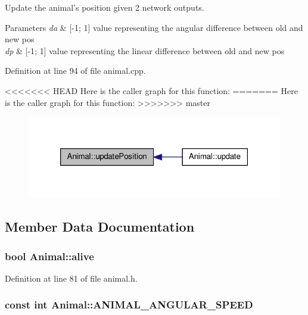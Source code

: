 Update the animal's position given 2 network outputs. 


\begin{DoxyParams}{Parameters}
{\em da} & \mbox{[}-\/1; 1\mbox{]} value representing the angular difference between old and new pos \\
\hline
{\em dp} & \mbox{[}-\/1; 1\mbox{]} value representing the linear difference between old and new pos \\
\hline
\end{DoxyParams}


Definition at line 94 of file animal.\-cpp.



<<<<<<< HEAD
Here is the caller graph for this function\-:
\nopagebreak
=======
Here is the caller graph for this function\-:\nopagebreak
>>>>>>> master
\begin{figure}[H]
\begin{center}
\leavevmode
\includegraphics[width=316pt]{class_animal_a0b6103b76a223ce2eaad73877ff85c73_icgraph}
\end{center}
\end{figure}




\subsection{Member Data Documentation}
\hypertarget{class_animal_a38d08d48cf5b16863bb40fa731b06629}{
\subsubsection[{alive}]{\setlength{\rightskip}{0pt plus 5cm}bool Animal\-::alive\hspace{0.3cm}{\ttfamily [protected]}}}\label{class_animal_a38d08d48cf5b16863bb40fa731b06629}


Definition at line 81 of file animal.\-h.

\hypertarget{class_animal_a4004efb93813a375712ad5d82a404659}{
\subsubsection[{A\-N\-I\-M\-A\-L\-\_\-\-A\-N\-G\-U\-L\-A\-R\-\_\-\-S\-P\-E\-E\-D}]{\setlength{\rightskip}{0pt plus 5cm}const int Animal\-::\-A\-N\-I\-M\-A\-L\-\_\-\-A\-N\-G\-U\-L\-A\-R\-\_\-\-S\-P\-E\-E\-D\hspace{0.3cm}{\ttfamily [protected]}}}\label{class_animal_a4004efb93813a375712ad5d82a404659}


